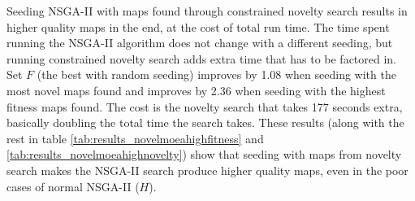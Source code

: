 \begin{table}[!h]
	\begin{center}
	\renewcommand{\arraystretch}{1}
	\caption{Results of NSGA-II seeded with highest novelty novel individuals.}
	\label{tab:results_novelmoeahighnovelty}
	\end{center}
\end{table}

Seeding NSGA-II with maps found through constrained novelty search results in higher quality maps in the end, at the cost of total run time. The time spent running the NSGA-II algorithm does not change with a different seeding, but running constrained novelty search adds extra time that has to be factored in. Set $F$ (the best with random seeding) improves by 1.08 when seeding with the most novel maps found and improves by 2.36 when seeding with the highest fitness maps found. The cost is the novelty search that takes 177 seconds extra, basically doubling the total time the search takes. These results (along with the rest in table \ref{tab:results_novelmoeahighfitness} and \ref{tab:results_novelmoeahighnovelty}) show that seeding with maps from novelty search makes the NSGA-II search produce higher quality maps, even in the poor cases of normal NSGA-II ($H$).

